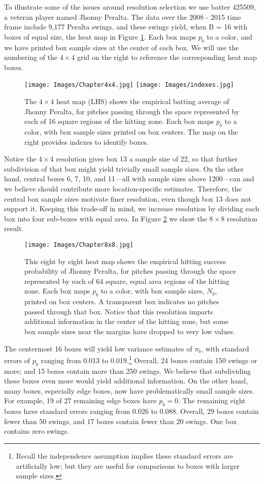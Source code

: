 To illustrate some of the issues around resolution selection we use batter 425509, a veteran player named Jhonny Peralta. The data over the 2008 - 2015 time frame include 9,177 Peralta swings, and these swings yield, when B = 16 with boxes of equal size, the heat map in Figure \ref{fig:4x4}.
Each box maps $p_{b}$ to a color, and we have printed box sample sizes at the center of each box. We will use the numbering of the $4 \times 4$ grid on the right to reference the corresponding heat map boxes. 
        \begin{figure}[H]
      	\centering
      	\texttt{[image: Images/Chapter4x4.jpg]} 
      	\texttt{[image: Images/indexes.jpg]}
      	\caption{The $4 \times 4$ heat map (LHS) shows the empirical batting average of Jhonny Peralta, for pitches passing through the space represented by each of 16 square regions of the hitting zone. Each box maps $p_{b}$ to a color, with box sample sizes printed on box centers. The map on the right provides indexes to identify boxes.}
      	\label{fig:4x4}
      	\end{figure} 
Notice the $4 \times 4$ resolution gives box 13 a sample size of 22, so that further subdivision of that box might yield trivially small sample sizes. On the other hand, central boxes 6, 7, 10, and 11---all with sample sizes above 1200---can and we believe should contribute more location-specific estimates. Therefore, the central box sample sizes motivate finer resolution, even though box 13 does not support it. Keeping this trade-off in mind, we increase resolution by dividing each box into four sub-boxes with equal area. In Figure \ref{fig:8x8} we show the $8 \times 8$ resolution result.
        \begin{figure}[H]
      	\centering
      	\texttt{[image: Images/Chapter8x8.jpg]} 
      	\caption{This eight by eight heat map shows the empirical hitting success probability of Jhonny Peralta, for pitches passing through the space represented by each of 64 square, equal area regions of the hitting zone. Each box maps $p_{b}$ to a color, with box sample sizes, $N_{b}$, printed on box centers. A transparent box indicates no pitches passed through that box. Notice that this resolution imparts additional information in the center of the hitting zone, but some box sample sizes near the margins have dropped to very low values.}
      	\label{fig:8x8}
      	\end{figure} 
The centermost 16 boxes will yield low variance estimates of $\pi_{b}$, with standard errors of $p_{b}$ ranging from 0.013 to 0.019.\footnote{Recall the independence assumption implies these standard errors are artificially low; but they are useful for comparisons to boxes with larger sample sizes.}  Overall, 24 boxes contain 150 swings or more; and 15 boxes contain more than 250 swings. We believe that subdividing these boxes even more would yield additional information. On the other hand, many boxes, especially edge boxes, now have problematically small sample sizes. For example, 19 of 27 remaining edge boxes have $p_{b} = 0$. The remaining eight boxes have standard errors ranging from 0.026 to 0.088. Overall, 29 boxes contain fewer than 50 swings, and 17 boxes contain fewer than 20 swings. One box contains zero swings.

